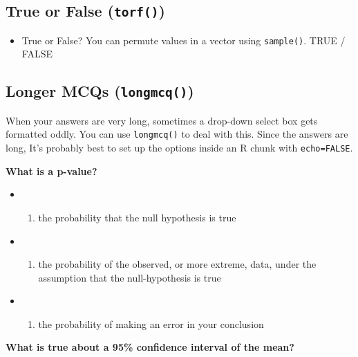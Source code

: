 \documentclass[
  letterpaper,
  DIV=11,
  numbers=noendperiod]{scrreprt}
\providecommand{\tightlist}{%
  \setlength{\itemsep}{0pt}\setlength{\parskip}{0pt}}\usepackage{longtable,booktabs,array}
\begin{document}
\subsection{\texorpdfstring{True or False
(\texttt{torf()})}{True or False (torf())}}\label{true-or-false-torf}

\begin{itemize}
\tightlist
\item
  True or False? You can permute values in a vector using
  \texttt{sample()}. TRUE / FALSE
\end{itemize}

\subsection{\texorpdfstring{Longer MCQs
(\texttt{longmcq()})}{Longer MCQs (longmcq())}}\label{longer-mcqs-longmcq}

When your answers are very long, sometimes a drop-down select box gets
formatted oddly. You can use \texttt{longmcq()} to deal with this. Since
the answers are long, It's probably best to set up the options inside an
R chunk with \texttt{echo=FALSE}.

\textbf{What is a p-value?}

\begin{itemize}
\tightlist
\item
  \begin{enumerate}
  \def\labelenumi{(\Alph{enumi})}
  \tightlist
  \item
    the probability that the null hypothesis is true\\
  \end{enumerate}
\item
  \begin{enumerate}
  \def\labelenumi{(\Alph{enumi})}
  \setcounter{enumi}{1}
  \tightlist
  \item
    the probability of the observed, or more extreme, data, under the
    assumption that the null-hypothesis is true\\
  \end{enumerate}
\item
  \begin{enumerate}
  \def\labelenumi{(\Alph{enumi})}
  \setcounter{enumi}{2}
  \tightlist
  \item
    the probability of making an error in your conclusion
  \end{enumerate}
\end{itemize}

\textbf{What is true about a 95\% confidence interval of the mean?}
\end{document}
